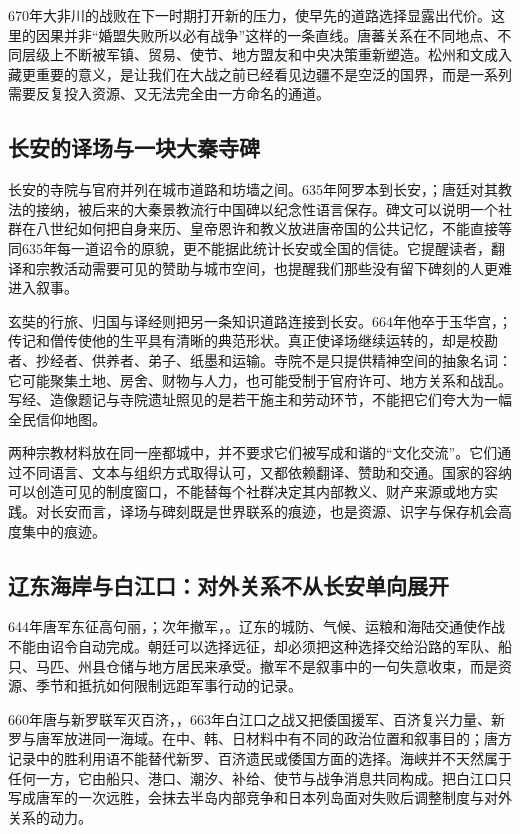 670年大非川的战败在下一时期打开新的压力，使早先的道路选择显露出代价。这里的因果并非“婚盟失败所以必有战争”这样的一条直线。唐蕃关系在不同地点、不同层级上不断被军镇、贸易、使节、地方盟友和中央决策重新塑造。松州和文成入藏更重要的意义，是让我们在大战之前已经看见边疆不是空泛的国界，而是一系列需要反复投入资源、又无法完全由一方命名的通道。

\subsection{长安的译场与一块大秦寺碑}
长安的寺院与官府并列在城市道路和坊墙之间。635年阿罗本到长安，；唐廷对其教法的接纳，被后来的大秦景教流行中国碑以纪念性语言保存。碑文可以说明一个社群在八世纪如何把自身来历、皇帝恩许和教义放进唐帝国的公共记忆，不能直接等同635年每一道诏令的原貌，更不能据此统计长安或全国的信徒。它提醒读者，翻译和宗教活动需要可见的赞助与城市空间，也提醒我们那些没有留下碑刻的人更难进入叙事。

玄奘的行旅、归国与译经则把另一条知识道路连接到长安。664年他卒于玉华宫，；传记和僧传使他的生平具有清晰的典范形状。真正使译场继续运转的，却是校勘者、抄经者、供养者、弟子、纸墨和运输。寺院不是只提供精神空间的抽象名词：它可能聚集土地、房舍、财物与人力，也可能受制于官府许可、地方关系和战乱。写经、造像题记与寺院遗址照见的是若干施主和劳动环节，不能把它们夸大为一幅全民信仰地图。

两种宗教材料放在同一座都城中，并不要求它们被写成和谐的“文化交流”。它们通过不同语言、文本与组织方式取得认可，又都依赖翻译、赞助和交通。国家的容纳可以创造可见的制度窗口，不能替每个社群决定其内部教义、财产来源或地方实践。对长安而言，译场与碑刻既是世界联系的痕迹，也是资源、识字与保存机会高度集中的痕迹。

\subsection{辽东海岸与白江口：对外关系不从长安单向展开}
644年唐军东征高句丽，；次年撤军，。辽东的城防、气候、运粮和海陆交通使作战不能由诏令自动完成。朝廷可以选择远征，却必须把这种选择交给沿路的军队、船只、马匹、州县仓储与地方居民来承受。撤军不是叙事中的一句失意收束，而是资源、季节和抵抗如何限制远距军事行动的记录。

660年唐与新罗联军灭百济，，663年白江口之战又把倭国援军、百济复兴力量、新罗与唐军放进同一海域。在中、韩、日材料中有不同的政治位置和叙事目的；唐方记录中的胜利用语不能替代新罗、百济遗民或倭国方面的选择。海峡并不天然属于任何一方，它由船只、港口、潮汐、补给、使节与战争消息共同构成。把白江口只写成唐军的一次远胜，会抹去半岛内部竞争和日本列岛面对失败后调整制度与对外关系的动力。

